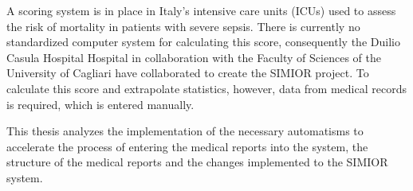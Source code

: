 \vspace{4cm}
A scoring system is in place in Italy's intensive care units (ICUs) used to assess the risk of mortality in patients with severe sepsis. There is currently no standardized computer system for calculating this score, consequently the Duilio Casula Hospital Hospital in collaboration with the Faculty of Sciences of the University of Cagliari have collaborated to create the SIMIOR project. To calculate this score and extrapolate statistics, however, data from medical records is required, which is entered manually.
\par\bigskip
This thesis analyzes the implementation of the necessary automatisms to accelerate the process of entering the medical reports into the system, the structure of the medical reports and the changes implemented to the SIMIOR system.